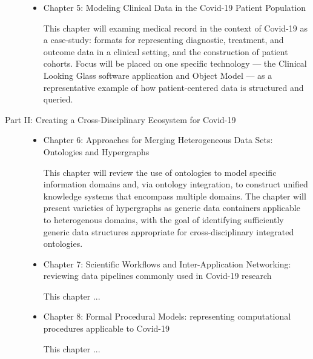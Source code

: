 \documentclass{statsoc}
\newenvironment{summary}[1][0]{\let\BEGIN\begin\let\END\end\grabsummary{#1}}{}%
\begin{document}
\begin{description}
\begin{itemize}
\item Chapter 5: Modeling Clinical Data in the Covid-19 Patient Population  

\begin{summary}
This chapter will examing medical record in the context of 
Covid-19 as a case-study: formats for representing 
diagnostic, treatment, and outcome data in a clinical setting, 
and the construction of patient cohorts.  Focus will be 
placed on one specific technology --- the 
Clinical Looking Glass software application and Object Model --- 
as a representative example of how patient-centered 
data is structured and queried.

\end{summary}

\end{itemize}

\item[Part II: Creating a Cross-Disciplinary Ecosystem for Covid-19]

\begin{itemize}

\item Chapter 6: Approaches for Merging Heterogeneous Data Sets: Ontologies and Hypergraphs

\begin{summary}
This chapter will review the use of ontologies to model 
specific information domains and, via ontology integration, 
to construct unified knowledge systems that encompass 
multiple domains.  The chapter will present varieties 
of hypergraphs as generic data containers applicable 
to heterogenous domains, with the goal of identifying 
sufficiently generic data structures appropriate 
for cross-disciplinary integrated ontologies.   
\end{summary}

\item Chapter 7: Scientific Workflows and Inter-Application Networking: reviewing data pipelines commonly used in Covid-19 research

\begin{summary}
This chapter ...
\end{summary}

\item Chapter 8: Formal Procedural Models: representing computational procedures applicable 
to Covid-19

\begin{summary}
This chapter ...
\end{summary}


\end{itemize}
\end{description}
\end{document}
